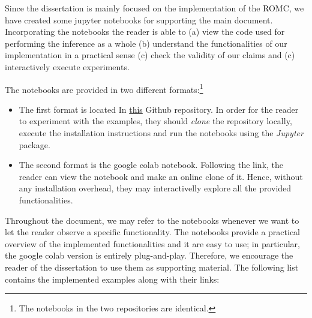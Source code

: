 Since the dissertation is mainly focused on the implementation of the
ROMC, we have created some jupyter notebooks for supporting the main
document. Incorporating the notebooks the reader is able to (a) view
the code used for performing the inference as a whole (b) understand
the functionalities of our implementation in a practical sense (c)
check the validity of our claims and (c) interactively execute
experiments.

The notebooks are provided in two different formats:\footnote{The
  notebooks in the two repositories are identical.}

\begin{itemize}
\item The first format is located In
  \href{https://github.com/givasile/edinburgh-thesis/tree/master/notebook_examples}{this}
  Github repository. In order for the reader to experiment with the
  examples, they should \textit{clone} the repository locally, execute
  the installation instructions and run the notebooks using the
  \textit{Jupyter} package.
\item The second format is the google colab notebook. Following the
  link, the reader can view the notebook and make an online clone of
  it. Hence, without any installation overhead, they may
  interactivelly explore all the provided functionalities.
\end{itemize}


Throughout the document, we may refer to the notebooks whenever we
want to let the reader observe a specific functionality. The notebooks
provide a practical overview of the implemented functionalities and
it are easy to use; in particular, the google colab version
is entirely plug-and-play. Therefore, we encourage the reader of the
dissertation to use them as supporting material.  The following list
contains the implemented examples along with their links:

